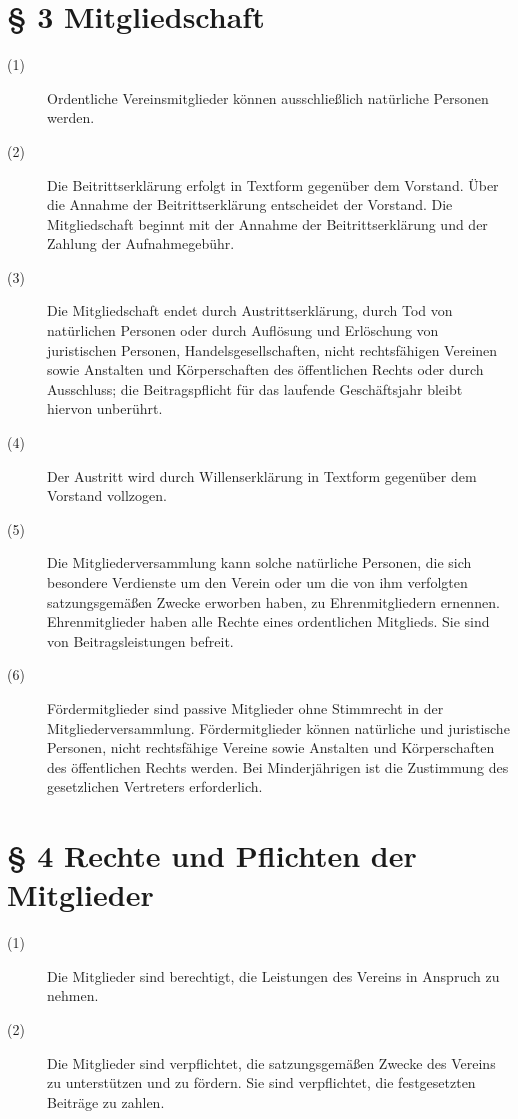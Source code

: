 \documentclass[12pt,paper=a4,ngerman]{scrreprt}
\begin{document}
\section{\S{} 3 Mitgliedschaft}
\begin{description}
	\item[(1)] Ordentliche Vereinsmitglieder können ausschließlich natürliche Personen werden.
	\item[(2)] Die Beitrittserklärung erfolgt in Textform gegenüber dem Vorstand. Über die Annahme der Beitrittserklärung entscheidet der Vorstand. Die Mitgliedschaft beginnt mit der Annahme der Beitrittserklärung und der Zahlung der Aufnahmegebühr.
	\item[(3)] Die Mitgliedschaft endet durch Austrittserklärung, durch Tod von natürlichen Personen oder durch Auflösung und Erlöschung von juristischen Personen, Handelsgesellschaften, nicht rechtsfähigen Vereinen sowie Anstalten und Körperschaften des öffentlichen Rechts oder durch Ausschluss; die Beitragspflicht für das laufende Geschäftsjahr bleibt hiervon unberührt.
	\item[(4)] Der Austritt wird durch Willenserklärung in Textform gegenüber dem Vorstand vollzogen.
	\item[(5)] Die Mitgliederversammlung kann solche natürliche Personen, die sich besondere Verdienste um den Verein oder um die von ihm verfolgten satzungsgemäßen Zwecke erworben haben, zu Ehrenmitgliedern ernennen. Ehrenmitglieder haben alle Rechte eines ordentlichen Mitglieds. Sie sind von Beitragsleistungen befreit.
	\item[(6)] Fördermitglieder sind passive Mitglieder ohne Stimmrecht in der Mitgliederversammlung. Fördermitglieder können natürliche und juristische Personen, nicht rechtsfähige Vereine sowie Anstalten und Körperschaften des öffentlichen Rechts werden. Bei Minderjährigen ist die Zustimmung des gesetzlichen Vertreters erforderlich.
\end{description}
\section{\S{} 4 Rechte und Pflichten der Mitglieder}
\begin{description}
	\item[(1)] Die Mitglieder sind berechtigt, die Leistungen des Vereins in Anspruch zu nehmen.
	\item[(2)] Die Mitglieder sind verpflichtet, die satzungsgemäßen Zwecke des Vereins zu unterstützen und zu fördern. Sie sind verpflichtet, die festgesetzten Beiträge zu zahlen.
\end{description}
\end{document}
